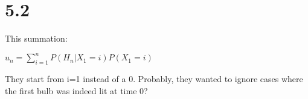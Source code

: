 \documentclass{article}
\begin{document}
\section{5.2}
This summation:


$u_n = \sum_{i=1}^n P(H_n | X_1=i)P(X_1=i)$$$$$

They start from i=1 instead of a 0. Probably, they wanted to ignore
cases where the first bulb was indeed lit at time 0?
\end{document}
